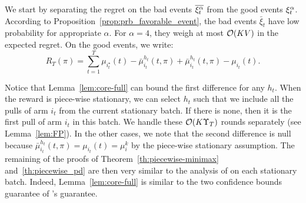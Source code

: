 We start by separating the regret on the bad events $\overline{\xi^\alpha_t}$ from the good events $\xi^\alpha_t$. According to Proposition~\ref{prop:prb_favorable_event}, the bad events $\bar{\xi}_t$ have low probability for appropriate $\alpha$. For $\alpha = 4$, they weigh at most $\mathcal{O}{\left(KV\right)}$ in the expected regret.  On the good events, we write:
\vspace{-4pt}
\begin{equation}
\label{eq:restless-regret-decompo}
R_T(\pi)= \sum_{t=1}^T \mu_{i_t^\star}(t) - \bar{\mu}_{i_t}^{h_t}(t, \pi) + \bar{\mu}_{i_t}^{h_t}(t, \pi) - \mu_{i_t}(t).   
\end{equation}

Notice that Lemma~\ref{lem:core-full} can bound the first difference for any $h_t$. When the reward is piece-wise stationary, we can select $h_t$ such that we include all the pulls of arm $i_t$ from the current stationary batch. If there is none, then it is the first pull of arm $i_t$ in this batch. We handle these $\mathcal{O}{\left(K\Upsilon_T\right)}$ rounds separately (see Lemma~\ref{lem:FP}). In the other cases, we note that the second difference is null because $\bar{\mu}_{i_t}^{h_t}(t, \pi) = \mu_{i_t}(t) = \mu_i^k$ by the piece-wise stationary assumption. The remaining of the proofs of Theorem~\ref{th:piecewise-minimax} and~\ref{th:piecewise_pd} are then very similar to the analysis of \cite{auer2002finite} on each stationary batch. Indeed, Lemma~\ref{lem:core-full} is similar to the two confidence bounds guarantee of \UCBone's guarantee.

